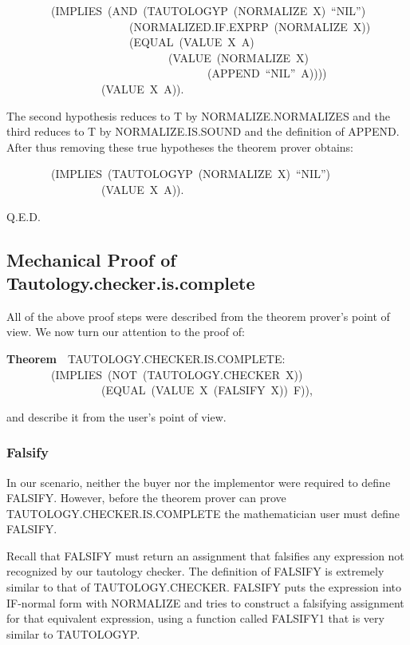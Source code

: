 \documentclass[10pt]{book}
\newenvironment{pubasis}{\begin{flushleft}}{\end{flushleft}}
\newcommand{\axiomordefinition}[1]{\vspace{6pt}\Large\textsf{\textbf{#1}}\normalsize}
\begin{document}
\begin{pubasis}
~~~~~~~~(IMPLIES~(AND~(TAUTOLOGYP~(NORMALIZE~X)~``NIL'')\\
~~~~~~~~~~~~~~~~~~~~~~(NORMALIZED.IF.EXPRP~(NORMALIZE~X))\\
~~~~~~~~~~~~~~~~~~~~~~(EQUAL~(VALUE~X~A)\\
~~~~~~~~~~~~~~~~~~~~~~~~~~~~~(VALUE~(NORMALIZE~X)\\
~~~~~~~~~~~~~~~~~~~~~~~~~~~~~~~~~~~~(APPEND~``NIL''~A))))\\
~~~~~~~~~~~~~~~~~(VALUE~X~A)).\\
\end{pubasis}
The second hypothesis reduces to T by NORMALIZE.NORMALIZES and the
third reduces to T by NORMALIZE.IS.SOUND and the definition of APPEND.
After thus removing these true hypotheses the theorem prover obtains:

\begin{pubasis}
~~~~~~~~(IMPLIES~(TAUTOLOGYP~(NORMALIZE~X)~``NIL'')\\
~~~~~~~~~~~~~~~~~(VALUE~X~A)).\\
\end{pubasis}
Q.E.D.

\subsection{Mechanical Proof of Tautology.checker.is.complete}
All of the above proof steps were described from the theorem prover's
point of view.  We now turn our attention to the proof of:
\begin{pubasis}
\axiomordefinition{Theorem}~~TAUTOLOGY.CHECKER.IS.COMPLETE:\\
~~~~~~~~(IMPLIES~(NOT~(TAUTOLOGY.CHECKER~X))\\
~~~~~~~~~~~~~~~~~(EQUAL~(VALUE~X~(FALSIFY~X))~F)),\\
\end{pubasis}
and describe it from the user's point of view.
\subsubsection{Falsify}
In our scenario, neither the buyer nor the implementor were
required to define FALSIFY.  However, before the theorem prover can prove
TAUTOLOGY.CHECKER.IS.COMPLETE the
mathematician user must define FALSIFY.

Recall that FALSIFY must return an assignment that falsifies any expression
not recognized by our tautology checker.
The definition of FALSIFY is extremely similar to that of TAUTOLOGY.CHECKER.  FALSIFY
puts the expression into IF-normal form with NORMALIZE and
tries to construct a falsifying assignment for that equivalent
expression, using a function called FALSIFY1 that is
very similar to TAUTOLOGYP.
\end{document}
